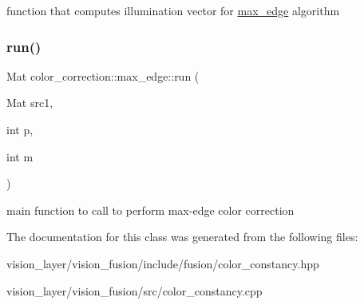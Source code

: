 function that computes illumination vector for \hyperlink{classcolor__correction_1_1max__edge}{max\+\_\+edge} algorithm \mbox{\label{classcolor__correction_1_1max__edge_ab986a6eeda0ae54621f48b1a3acde38d}} 
\subsubsection{\texorpdfstring{run()}{run()}}
{\footnotesize\ttfamily Mat color\+\_\+correction\+::max\+\_\+edge\+::run (\begin{DoxyParamCaption}\item[{Mat}]{src1,  }\item[{int}]{p,  }\item[{int}]{m }\end{DoxyParamCaption})}

main function to call to perform max-\/edge color correction 

The documentation for this class was generated from the following files\+:\begin{DoxyCompactItemize}
\item 
vision\+\_\+layer/vision\+\_\+fusion/include/fusion/color\+\_\+constancy.\+hpp\item 
vision\+\_\+layer/vision\+\_\+fusion/src/color\+\_\+constancy.\+cpp\end{DoxyCompactItemize}
